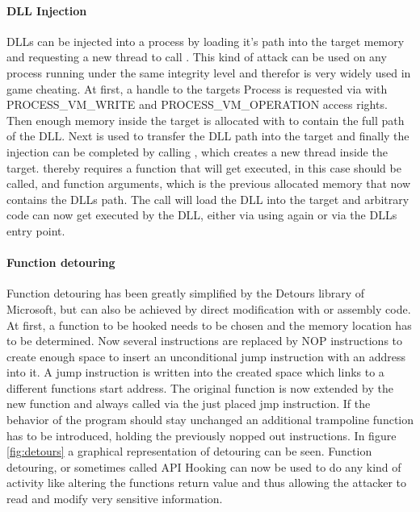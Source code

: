 \paragraph{ DLL Injection}
DLLs can be injected into a process by loading it's path into the target memory and requesting a new thread to call . This kind of attack can be used on any process running under the same integrity level and therefor is very widely used in game cheating. At first, a handle to the targets Process is requested via  with PROCESS\_VM\_WRITE and PROCESS\_VM\_OPERATION access rights. Then enough memory inside the target is allocated with  to contain the full path of the DLL. Next  is used to transfer the DLL path into the target and finally the injection can be completed by calling , which creates a new thread inside the target.  thereby requires a function that will get executed, in this case  should be called, and function arguments, which is the previous allocated memory that now contains the DLLs path. The  call will load the DLL into the target and arbitrary code can now get executed by the DLL, either via using  again or via the DLLs entry point.
\paragraph{Function detouring}
Function detouring has been greatly simplified by the Detours\cite{msdetours} library of Microsoft, but can also be achieved by direct modification with  or assembly code. At first, a function to be hooked needs to be chosen and the memory location has to be determined. Now several instructions are replaced by NOP instructions to create enough space to insert an unconditional jump instruction with an address into it. A jump instruction is written into the created space which links to a different functions start address. The original function is now extended by the new function and always called via the just placed jmp instruction. If the behavior of the program should stay unchanged an additional trampoline function has to be introduced, holding the previously nopped out instructions. In figure \ref{fig:detours} a graphical representation of detouring can be seen. Function detouring, or sometimes called API Hooking can now be used to do any kind of activity like altering the functions return value and thus allowing the attacker to read and modify very sensitive information.

